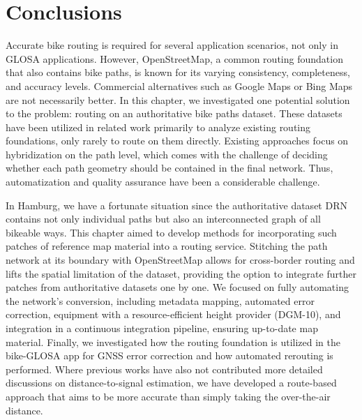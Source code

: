 \section{Conclusions}

Accurate bike routing is required for several application scenarios, not only in GLOSA applications. However, OpenStreetMap, a common routing foundation that also contains bike paths, is known for its varying consistency, completeness, and accuracy levels. Commercial alternatives such as Google Maps or Bing Maps are not necessarily better. In this chapter, we investigated one potential solution to the problem: routing on an authoritative bike paths dataset. These datasets have been utilized in related work primarily to analyze existing routing foundations, only rarely to route on them directly. Existing approaches focus on hybridization on the path level, which comes with the challenge of deciding whether each path geometry should be contained in the final network. Thus, automatization and quality assurance have been a considerable challenge. 

In Hamburg, we have a fortunate situation since the authoritative dataset DRN contains not only individual paths but also an interconnected graph of all bikeable ways. This chapter aimed to develop methods for incorporating such patches of reference map material into a routing service. Stitching the path network at its boundary with OpenStreetMap allows for cross-border routing and lifts the spatial limitation of the dataset, providing the option to integrate further patches from authoritative datasets one by one. We focused on fully automating the network's conversion, including metadata mapping, automated error correction, equipment with a resource-efficient height provider (DGM-10), and integration in a continuous integration pipeline, ensuring up-to-date map material. Finally, we investigated how the routing foundation is utilized in the bike-GLOSA app for GNSS error correction and how automated rerouting is performed. Where previous works have also not contributed more detailed discussions on distance-to-signal estimation, we have developed a route-based approach that aims to be more accurate than simply taking the over-the-air distance. 

